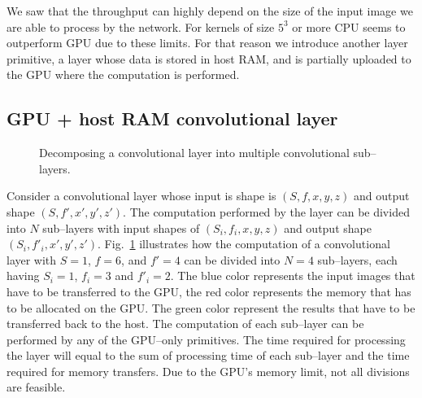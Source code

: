 \documentclass[conference]{./IEEEtran/IEEEtran}
\begin{document}
  We saw that the throughput can highly depend on the size of the
  input image we are able to process by the network.  For kernels of
  size $5^3$ or more CPU seems to outperform GPU due to these
  limits.  For that reason we introduce another layer primitive, a
  layer whose data is stored in host RAM, and is partially uploaded to
  the GPU where the computation is performed.

\subsection{GPU + host RAM convolutional layer}

  \begin{figure}
    \centering
    \caption{Decomposing a convolutional layer into multiple
      convolutional sub--layers.}
    \label{fig:partial_exec}
  \end{figure}

  Consider a convolutional layer whose input is shape is $(S,f,x,y,z)$
  and output shape $(S,f',x',y',z')$.  The computation performed by
  the layer can be divided into $N$ sub--layers with input shapes of
  $(S_i,f_i,x,y,z)$ and output shape $(S_i,f'_i,x',y',z')$.
  Fig.~\ref{fig:partial_exec} illustrates how the computation of a
  convolutional layer with $S=1$, $f=6$, and $f'=4$ can be divided
  into $N=4$ sub--layers, each having $S_i=1$, $f_i=3$ and $f'_i=2$.
  The blue color represents the input images that have to be
  transferred to the GPU, the red color represents the memory that has
  to be allocated on the GPU.  The green color represent the results
  that have to be transferred back to the host.  The computation of
  each sub--layer can be performed by any of the GPU--only primitives.
  The time required for processing the layer will equal to the sum of
  processing time of each sub--layer and the time required for memory
  transfers.  Due to the GPU's memory limit, not all divisions are
  feasible.
\end{document}
